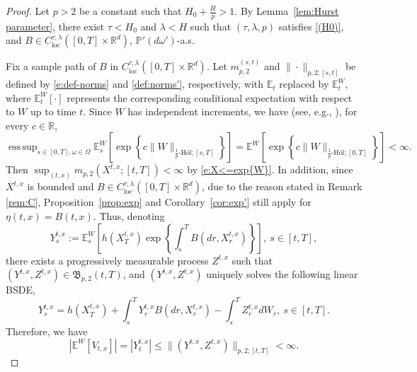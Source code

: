 \documentclass[11pt,reqno]{amsart}
\def\R{\mathbb R}
\DeclareMathOperator*{\esssup}{ess\,sup}
\numberwithin{equation}{section}
\begin{document}
\begin{proof}
Let $p>2$ be a constant such that $H_0+\frac{H}{p}>1.$ By Lemma~\ref{lem:Hurst parameter}, there exist $\tau<H_0$ and $\lambda<H$ such that $(\tau,\lambda,p)$ satisfies \ref{(H0)}, and $B\in C^{\tau,\lambda}_{\text{loc}}([0,T]\times\R^{d})$, $\mathbb{P}'(d \omega')$-a.s.


Fix a sample path of $B$ in $C^{\tau,\lambda}_{\text{loc}}([0,T]\times\R^{d})$. Let $m^{(s,t)}_{p,2}$ and $\|\cdot\|_{p,2;[s,t]}$ be defined by \eqref{e:def-norms} and \eqref{def:norms'}, respectively, 
with $\mathbb{E}_{t}$ replaced by $\mathbb{E}^{W}_{t}$, where $\mathbb{E}^{W}_{t}[\cdot]$ represents the corresponding conditional expectation with respect to $W$ up to time $t$. Since $W$ has independent increments, we have
(see, e.g., \cite[Lemma~B.1]{HuLe}), for every $c\in\R$,
\begin{equation}\label{e:BMO of exp W}
\esssup_{s\in[0,T],\omega\in\Omega}\mathbb{E}^{W}_{s}\left[\exp\left\{c\|W\|_{\frac{1}{p}\text{-H\"ol};[s,T]}\right\}\right] = \mathbb{E}^{W}\left[\exp\left\{c\|W\|_{\frac{1}{p}\text{-H\"ol};[0,T]}\right\}\right] <\infty.
\end{equation}
Then $\sup_{(t,x)}m_{p,2}(X^{t,x};[t,T])<\infty$ by \eqref{e:X<=exp{W}}. In addition, since $X^{t,x}$ is bounded and $B\in C^{\tau,\lambda}_{\text{loc}}([0,T]\times\R^d)$, due to the reason stated in Remark \ref{rem:C},  Proposition~\ref{prop:exp} and Corollary~\ref{cor:exp'} still apply for $\eta(t,x) = B(t,x).$ Thus, denoting
\begin{equation*}
Y^{t,x}_{s}:=\mathbb{E}^{W}_{s}\left[h(X^{t,x}_{T})\exp\left\{\int_{s}^{T}B(dr,X^{t,x}_{r})\right\}\right],\ s\in[t,T],
\end{equation*}
there exists a progressively measurable process $Z^{t,x}$ such that $(Y^{t,x},Z^{t,x})\in \mathfrak{B}_{p,2}(t,T)$, and $(Y^{t,x},Z^{t,x})$ uniquely solves the following linear BSDE,
\begin{equation}\label{e:Neu linear BSDE}
Y^{t,x}_{s} = h(X^{t,x}_{T}) + \int_{s}^{T}Y^{t,x}_{r}B(dr,X^{t,x}_{r}) - \int_{s}^{T}Z^{t,x}_{r}dW_{r},\ s\in[t,T].
\end{equation}
Therefore, we have 
\begin{equation*}
\left|\mathbb{E}^{W}\left[ V_{t,x}\right]\right| = |Y^{t,x}_{t}| \le  \|(Y^{t,x},Z^{t,x})\|_{p,2;[t,T]} < \infty. 
\end{equation*}


\end{proof}
\end{document}
